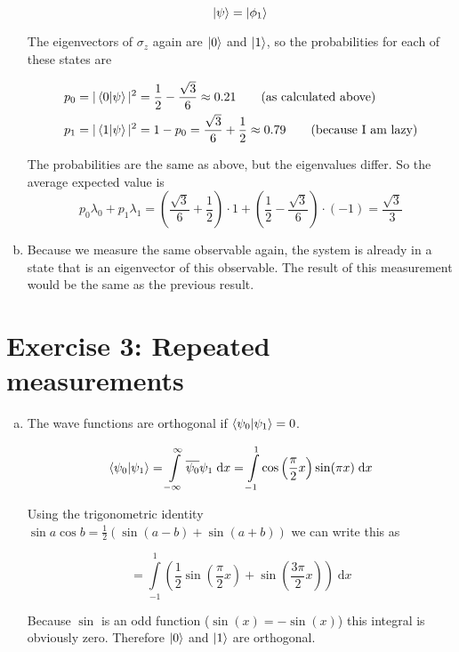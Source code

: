 \documentclass[a4paper,german,12pt,smallheadings]{scrartcl}
\begin{document}
\begin{enumerate}[a)]
    \begin{equation*}
      \ket{\psi} = \ket{\phi_1}
    \end{equation*}

    The eigenvectors of $\sigma_z$ again are $\ket{0}$ and $\ket{1}$, so the
    probabilities for each of these states are

    \begin{align*}
      p_0 &= |\braket{0|\psi}|^2 = \frac{1}{2} - \frac{\sqrt{3}}{6} \approx 0.21 \qquad \text{(as calculated above)} \\
      p_1 &= |\braket{1|\psi}|^2 = 1-p_0 = \frac{\sqrt{3}}{6} + \frac{1}{2} \approx 0.79 \qquad \text{(because I am lazy)}
    \end{align*}

    The probabilities are the same as above, but the eigenvalues differ. So the
    average expected value is
    \begin{equation*}
      p_0 \lambda_0 + p_1\lambda_1 = 
      \left(\frac{\sqrt{3}}{6}+\frac{1}{2}\right)\cdot1 + 
      \left(\frac{1}{2} - \frac{\sqrt{3}}{6}\right) \cdot (-1) =
      \frac{\sqrt{3}}{3}
    \end{equation*}
  \item
    Because we measure the same observable again, the system is already in
    a state that is an eigenvector of this observable. The result of this
    measurement would be the same as the previous result.
\end{enumerate}

\section*{Exercise 3: Repeated measurements}
\begin{enumerate}[a)]
  \item
    The wave functions are orthogonal if $\braket{\psi_0|\psi_1} = 0$.

    \begin{equation*}
      \braket{\psi_0|\psi_1} 
      = \int\limits_{- \infty}^{\infty} \overline{\psi_0} \psi_1 \; \text{d}x
      = \int\limits_{- 1}^{1} \cos\left(\frac{\pi}{2}x\right) \sin(\pi x) \; \text{d}x
    \end{equation*}

    Using the trigonometric identity $\sin a \cos b = \frac{1}{2} \left( \sin(a
    -b) + \sin(a+b) \right)$ we can write this as

    \begin{equation*}
      = \int\limits_{-1}^{1} \left(\frac{1}{2} \sin\left(\frac{\pi}{2} x\right) + \sin \left( \frac{3 \pi}{2} x\right)\right) \;\text{d}x
    \end{equation*}

    Because $\sin$ is an odd function ($\sin(x) = -\sin(x)$) this integral is
    obviously zero. Therefore $\ket{0}$ and $\ket{1}$ are orthogonal.

\end{enumerate}
\end{document}
